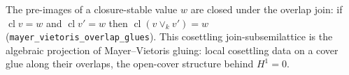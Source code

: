 \begin{theorem}\label{thm:mayer-vietoris}\leanok{}
The pre-images of a closure-stable value $w$ are closed under the overlap join: if $\operatorname{cl} v = w$ and $\operatorname{cl} v' = w$ then $\operatorname{cl}(v \vee_k v') = w$ (\texttt{mayer\_vietoris\_overlap\_glues}). This cosettling join-subsemilattice is the algebraic projection of Mayer--Vietoris gluing: local cosettling data on a cover glue along their overlaps, the open-cover structure behind $H^1 = 0$.
\end{theorem}

